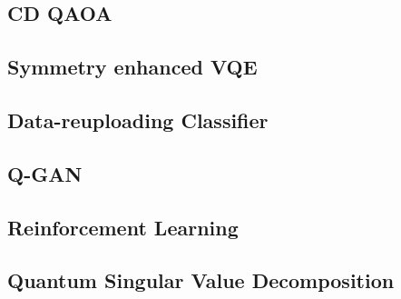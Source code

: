 \subsection{CD QAOA}


\subsection{Symmetry enhanced VQE}


\subsection{Data-reuploading Classifier}


\subsection{Q-GAN}


\subsection{Reinforcement Learning}


\subsection{Quantum Singular Value Decomposition}

